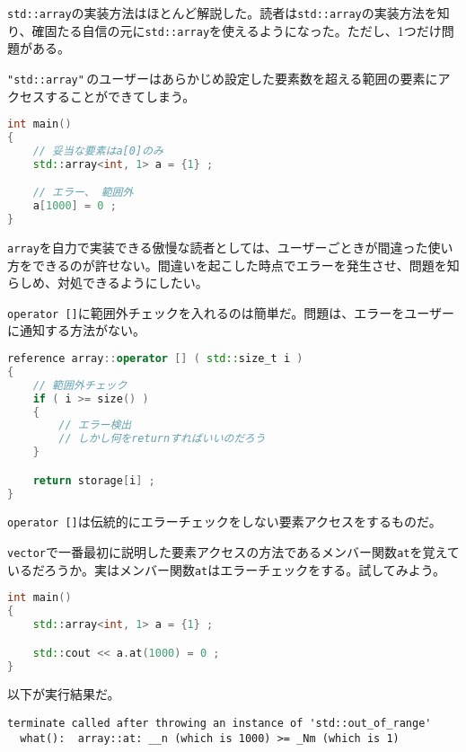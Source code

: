 

\texttt{std::array}の実装方法はほとんど解説した。読者は\texttt{std::array}の実装方法を知り、確固たる自信の元に\texttt{std::array}を使えるようになった。ただし、1つだけ問題がある。

\texttt{"std::array"}\,のユーザーはあらかじめ設定した要素数を超える範囲の要素にアクセスすることができてしまう。

\begin{lstlisting}[language={C++}]
int main()
{
    // 妥当な要素はa[0]のみ
    std::array<int, 1> a = {1} ;

    // エラー、 範囲外
    a[1000] = 0 ;
}
\end{lstlisting}

\texttt{array}を自力で実装できる傲慢な読者としては、ユーザーごときが間違った使い方をできるのが許せない。間違いを起こした時点でエラーを発生させ、問題を知らしめ、対処できるようにしたい。

\texttt{operator []}に範囲外チェックを入れるのは簡単だ。問題は、エラーをユーザーに通知する方法がない。

\ifTombow\pagebreak\fi
\begin{lstlisting}[language={C++}]
reference array::operator [] ( std::size_t i )
{
    // 範囲外チェック
    if ( i >= size() )
    {
        // エラー検出
        // しかし何をreturnすればいいのだろう
    }

    return storage[i] ;
}
\end{lstlisting}

\texttt{operator []}は伝統的にエラーチェックをしない要素アクセスをするものだ。

\texttt{vector}で一番最初に説明した要素アクセスの方法であるメンバー関数\texttt{at}を覚えているだろうか。実はメンバー関数\texttt{at}はエラーチェックをする。試してみよう。

\begin{lstlisting}[language={C++}]
int main()
{
    std::array<int, 1> a = {1} ;

    std::cout << a.at(1000) = 0 ;
}
\end{lstlisting}

以下が実行結果だ。

\begin{lstlisting}[style=terminal]
terminate called after throwing an instance of 'std::out_of_range'
  what():  array::at: __n (which is 1000) >= _Nm (which is 1)
\end{lstlisting}

